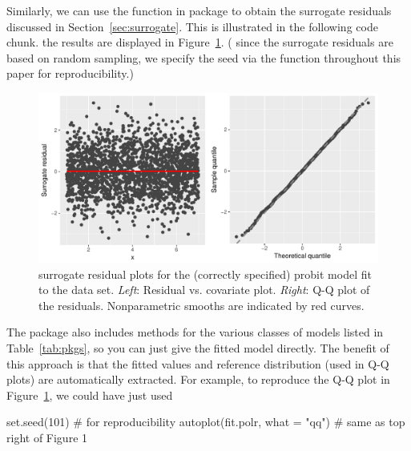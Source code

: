 Similarly, we can use the  function in package  to obtain the surrogate residuals discussed in Section~\ref{sec:surrogate}. This is illustrated in the following code chunk. the results are displayed in Figure~\ref{fig:quadratic-correct-surrogate}. ( since the surrogate residuals are based on random sampling, we specify the seed via the  function throughout this paper for reproducibility.)
\begin{figure}[!htbp]
  \centering
  \includegraphics[width=1\textwidth]{quadratic-correct-surrogate}
  \caption{surrogate residual plots for the (correctly specified) probit model fit to the  data set. \textit{Left}: Residual vs. covariate plot. \textit{Right}: Q-Q plot of the residuals. Nonparametric smooths are indicated by red curves.}
  \label{fig:quadratic-correct-surrogate}
\end{figure}

The  package also includes  methods for the various classes of models listed in Table~\ref{tab:pkgs}, so you can just give  the fitted model directly. The benefit of this approach is that the fitted values and reference distribution (used in Q-Q plots) are automatically extracted. For example, to reproduce the Q-Q plot in Figure~\ref{fig:quadratic-correct-surrogate}, we could have just used
\begin{example}
set.seed(101)  # for reproducibility
autoplot(fit.polr, what = "qq")  # same as top right of Figure 1
\end{example}


